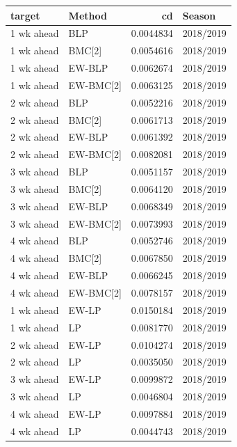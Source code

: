 \documentclass[
]{article}
\begin{document}
\begin{tabular}{l|l|r|l}
\hline
target & Method & cd & Season\\
\hline
1 wk ahead & BLP & 0.0044834 & 2018/2019\\
\hline
1 wk ahead & BMC[2] & 0.0054616 & 2018/2019\\
\hline
1 wk ahead & EW-BLP & 0.0062674 & 2018/2019\\
\hline
1 wk ahead & EW-BMC[2] & 0.0063125 & 2018/2019\\
\hline
2 wk ahead & BLP & 0.0052216 & 2018/2019\\
\hline
2 wk ahead & BMC[2] & 0.0061713 & 2018/2019\\
\hline
2 wk ahead & EW-BLP & 0.0061392 & 2018/2019\\
\hline
2 wk ahead & EW-BMC[2] & 0.0082081 & 2018/2019\\
\hline
3 wk ahead & BLP & 0.0051157 & 2018/2019\\
\hline
3 wk ahead & BMC[2] & 0.0064120 & 2018/2019\\
\hline
3 wk ahead & EW-BLP & 0.0068349 & 2018/2019\\
\hline
3 wk ahead & EW-BMC[2] & 0.0073993 & 2018/2019\\
\hline
4 wk ahead & BLP & 0.0052746 & 2018/2019\\
\hline
4 wk ahead & BMC[2] & 0.0067850 & 2018/2019\\
\hline
4 wk ahead & EW-BLP & 0.0066245 & 2018/2019\\
\hline
4 wk ahead & EW-BMC[2] & 0.0078157 & 2018/2019\\
\hline
1 wk ahead & EW-LP & 0.0150184 & 2018/2019\\
\hline
1 wk ahead & LP & 0.0081770 & 2018/2019\\
\hline
2 wk ahead & EW-LP & 0.0104274 & 2018/2019\\
\hline
2 wk ahead & LP & 0.0035050 & 2018/2019\\
\hline
3 wk ahead & EW-LP & 0.0099872 & 2018/2019\\
\hline
3 wk ahead & LP & 0.0046804 & 2018/2019\\
\hline
4 wk ahead & EW-LP & 0.0097884 & 2018/2019\\
\hline
4 wk ahead & LP & 0.0044743 & 2018/2019\\
\hline
\end{tabular}
\end{document}
